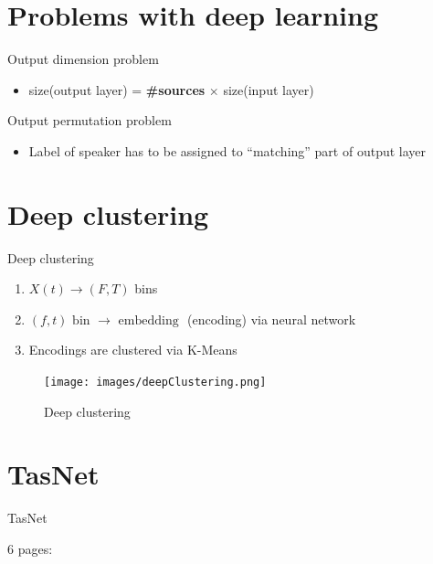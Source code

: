 \documentclass[xcolor=table,mathserif,9pt]{beamer}    %
\begin{document}
\section{Problems with deep learning}%
\label{sec:problems_with_deep_learning}
\begin{frame}{Output dimension problem}

\begin{itemize}
	\item size(output layer) = \textbf{\#sources} $\times$ size(input layer)
\end{itemize}

\end{frame}

\begin{frame}{Output permutation problem}
	\begin{itemize}
		\item Label of speaker has to be assigned to ``matching'' part of output layer
	\end{itemize}

\end{frame}

\section{Deep clustering}%
\label{sec:deep_clustering}
\begin{frame}{Deep clustering }

\begin{enumerate}
	\item $X(t) \to (F,T)$ bins
	\item $(f,t) \text{ bin } \to \text{ embedding }$ (encoding) via neural network
	\item Encodings are clustered via K-Means
\end{enumerate}

\begin{figure}[htpb]
	\centering
	\texttt{[image: images/deepClustering.png]}
	\caption{Deep clustering \cite{DCFigure}}
\end{figure}

\end{frame}

\section{TasNet}%
\label{sec:tasnet}
\begin{frame}{TasNet}

6 pages:
\end{frame}
\end{document}
